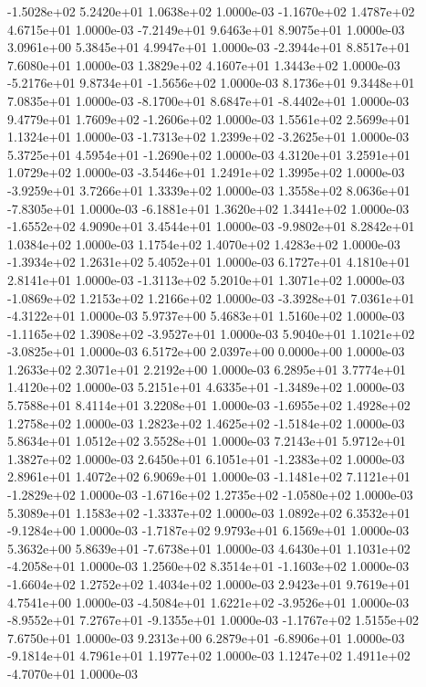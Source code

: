 -1.5028e+02  5.2420e+01  1.0638e+02  1.0000e-03
-1.1670e+02  1.4787e+02  4.6715e+01  1.0000e-03
-7.2149e+01  9.6463e+01  8.9075e+01  1.0000e-03
3.0961e+00 5.3845e+01 4.9947e+01  1.0000e-03
-2.3944e+01  8.8517e+01  7.6080e+01  1.0000e-03
1.3829e+02 4.1607e+01 1.3443e+02  1.0000e-03
-5.2176e+01  9.8734e+01 -1.5656e+02  1.0000e-03
8.1736e+01 9.3448e+01 7.0835e+01  1.0000e-03
-8.1700e+01  8.6847e+01 -8.4402e+01  1.0000e-03
 9.4779e+01  1.7609e+02 -1.2606e+02  1.0000e-03
1.5561e+02 2.5699e+01 1.1324e+01  1.0000e-03
-1.7313e+02  1.2399e+02 -3.2625e+01  1.0000e-03
 5.3725e+01  4.5954e+01 -1.2690e+02  1.0000e-03
4.3120e+01 3.2591e+01 1.0729e+02  1.0000e-03
-3.5446e+01  1.2491e+02  1.3995e+02  1.0000e-03
-3.9259e+01  3.7266e+01  1.3339e+02  1.0000e-03
 1.3558e+02  8.0636e+01 -7.8305e+01  1.0000e-03
-6.1881e+01  1.3620e+02  1.3441e+02  1.0000e-03
-1.6552e+02  4.9090e+01  3.4544e+01  1.0000e-03
-9.9802e+01  8.2842e+01  1.0384e+02  1.0000e-03
1.1754e+02 1.4070e+02 1.4283e+02  1.0000e-03
-1.3934e+02  1.2631e+02  5.4052e+01  1.0000e-03
6.1727e+01 4.1810e+01 2.8141e+01  1.0000e-03
-1.3113e+02  5.2010e+01  1.3071e+02  1.0000e-03
-1.0869e+02  1.2153e+02  1.2166e+02  1.0000e-03
-3.3928e+01  7.0361e+01 -4.3122e+01  1.0000e-03
5.9737e+00 5.4683e+01 1.5160e+02  1.0000e-03
-1.1165e+02  1.3908e+02 -3.9527e+01  1.0000e-03
 5.9040e+01  1.1021e+02 -3.0825e+01  1.0000e-03
6.5172e+00 2.0397e+00 0.0000e+00  1.0000e-03
1.2633e+02 2.3071e+01 2.2192e+00  1.0000e-03
6.2895e+01 3.7774e+01 1.4120e+02  1.0000e-03
 5.2151e+01  4.6335e+01 -1.3489e+02  1.0000e-03
5.7588e+01 8.4114e+01 3.2208e+01  1.0000e-03
-1.6955e+02  1.4928e+02  1.2758e+02  1.0000e-03
 1.2823e+02  1.4625e+02 -1.5184e+02  1.0000e-03
5.8634e+01 1.0512e+02 3.5528e+01  1.0000e-03
7.2143e+01 5.9712e+01 1.3827e+02  1.0000e-03
 2.6450e+01  6.1051e+01 -1.2383e+02  1.0000e-03
2.8961e+01 1.4072e+02 6.9069e+01  1.0000e-03
-1.1481e+02  7.1121e+01 -1.2829e+02  1.0000e-03
-1.6716e+02  1.2735e+02 -1.0580e+02  1.0000e-03
 5.3089e+01  1.1583e+02 -1.3337e+02  1.0000e-03
 1.0892e+02  6.3532e+01 -9.1284e+00  1.0000e-03
-1.7187e+02  9.9793e+01  6.1569e+01  1.0000e-03
 5.3632e+00  5.8639e+01 -7.6738e+01  1.0000e-03
 4.6430e+01  1.1031e+02 -4.2058e+01  1.0000e-03
 1.2560e+02  8.3514e+01 -1.1603e+02  1.0000e-03
-1.6604e+02  1.2752e+02  1.4034e+02  1.0000e-03
2.9423e+01 9.7619e+01 4.7541e+00  1.0000e-03
-4.5084e+01  1.6221e+02 -3.9526e+01  1.0000e-03
-8.9552e+01  7.2767e+01 -9.1355e+01  1.0000e-03
-1.1767e+02  1.5155e+02  7.6750e+01  1.0000e-03
 9.2313e+00  6.2879e+01 -6.8906e+01  1.0000e-03
-9.1814e+01  4.7961e+01  1.1977e+02  1.0000e-03
 1.1247e+02  1.4911e+02 -4.7070e+01  1.0000e-03
